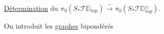 
 \uline{Détermination} du $\pi_0(S_*\mathscr{T}\mathbb{D}_{\mathrm{top}})\xrightarrow{\sim}\pi_0(S_*\mathscr{T}\mathbb{D}_{\mathrm{top}}^{\pm})$.

On introduit les \uline{graphes}  bipondérés

